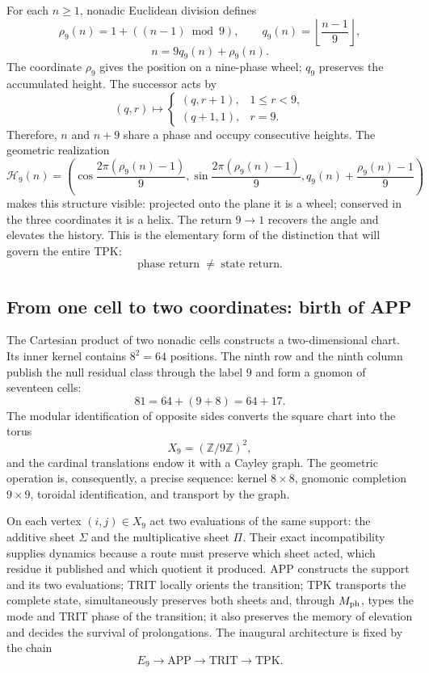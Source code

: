For each \(n\ge1\), nonadic Euclidean division defines
\[
 \rho_9(n)=1+((n-1)\bmod9),
 \qquad
 q_9(n)=\left\lfloor\frac{n-1}{9}\right\rfloor,
\]
\begin{equation}
 n=9q_9(n)+\rho_9(n).
 \label{eq:rueda-helice-nonadica-revfinal}
\end{equation}
The coordinate \(\rho_9\) gives the position on a nine-phase wheel;
\(q_9\) preserves the accumulated height. The successor acts by
\[
 (q,r)\longmapsto
 \begin{cases}
 (q,r+1),&1\le r<9,\\
 (q+1,1),&r=9.
 \end{cases}
\]
Therefore, \(n\) and \(n+9\) share a phase and occupy consecutive heights. The
geometric realization
\[
 \mathcal H_9(n)=
 \left(
  \cos\frac{2\pi(\rho_9(n)-1)}9,
  \sin\frac{2\pi(\rho_9(n)-1)}9,
  q_9(n)+\frac{\rho_9(n)-1}{9}
 \right)
\]
makes this structure visible: projected onto the plane it is a wheel;
conserved in the three coordinates it is a helix. The return \(9\to1\)
recovers the angle and elevates the history. This is the elementary form of the
distinction that will govern the entire TPK:
\[
 \boxed{\text{phase return}\;\neq\;\text{state return}.}
\]

\subsection{From one cell to two coordinates: birth of APP}

The Cartesian product of two nonadic cells constructs a two-dimensional
chart. Its inner kernel contains \(8^2=64\) positions. The ninth
row and the ninth column publish the null residual class through the label
\(9\) and form a gnomon of seventeen cells:
\[
 81=64+(9+8)=64+17.
\]
The modular identification of opposite sides converts the square chart
into the torus
\[
 X_9=(\mathbb Z/9\mathbb Z)^2,
\]
and the cardinal translations endow it with a Cayley graph. The geometric
operation is, consequently, a precise sequence: kernel
\(8\times8\), gnomonic completion \(9\times9\), toroidal identification, and
transport by the graph.

On each vertex \((i,j)\in X_9\) act two evaluations of the same support:
the additive sheet \(\Sigma\) and the multiplicative sheet \(\Pi\). Their
exact incompatibility supplies dynamics because a route must preserve which
sheet acted, which residue it published and which quotient it produced. APP constructs the
support and its two evaluations; TRIT locally orients the transition; TPK
transports the complete state, simultaneously preserves both sheets and, through
\(M_{\rm ph}\), types the mode and TRIT phase of the transition; it also preserves the
memory of elevation and decides the survival of prolongations. The
inaugural architecture is fixed by the chain
\[
 \boxed{
 E_9\longrightarrow
 \mathrm{APP}\longrightarrow
 \mathrm{TRIT}\longrightarrow
 \mathrm{TPK}.}
\]

